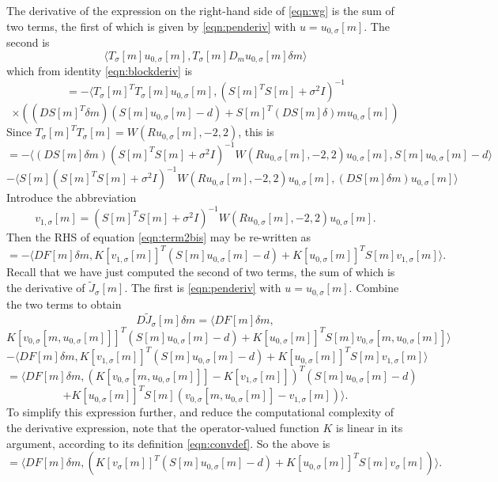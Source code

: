 The derivative of the expression on the right-hand side of
\ref{eqn:wg} is the sum of two terms, the first of which is given by
\ref{eqn:penderiv} with $u = u_{0,\sigma}[m]$. The second is
\[
  \langle T_{\sigma}[m]u_{0,\sigma}[m], T_{\sigma}[m]D_m
  u_{0,\sigma}[m]\delta m \rangle
\]
which from identity \ref{eqn:blockderiv} is
\[
  = -\langle  T_{\sigma}[m]^TT_{\sigma}[m]u_{0,\sigma}[m], (S[m]^TS[m] + \sigma^2I)^{-1}
\]
\[
  \times ((DS[m]^{T}\delta m) (S[m]u_{0,\sigma}[m]-d) +
  S[m]^T(DS[m]\delta) m u_{0,\sigma}[m])
\]
Since
$T_{\sigma}[m]^TT_{\sigma}[m] = W(Ru_{0,\sigma}[m],-2,2)$, this is
\[
  = -\langle (DS[m]\delta m) (S[m]^TS[m] +
  \sigma^2I)^{-1}W(Ru_{0,\sigma}[m],-2,2)u_{0,\sigma}[m],
  S[m]u_{0,\sigma}[m] - d \rangle
\]
\begin{equation}
  \label{eqn:term2}
  - \langle S[m] (S[m]^TS[m] +
  \sigma^2I)^{-1}W(Ru_{0,\sigma}[m],-2,2)u_{0,\sigma}[m], (DS[m]\delta
  m)u_{0,\sigma}[m] \rangle
\end{equation}
Introduce the abbreviation
\begin{equation}
  \label{eqn:defv1}
  v_{1,\sigma}[m] = (S[m]^TS[m] + \sigma^2I)^{-1}W(Ru_{0,\sigma}[m],-2,2)u_{0,\sigma}[m].
\end{equation}
Then the RHS of equation \ref{eqn:term2bis} may be re-written as
\begin{equation}
  \label{eqn:term2bis}
  = -\langle DF[m]\delta m, K[v_{1,\sigma}[m]]^T (S[m]u_{0,\sigma}[m]-d) + 
  K[u_{0,\sigma}[m]]^T S[m] v_{1,\sigma}[m] \rangle.
\end{equation}
Recall that we have just computed the second of two terms, the sum of
which is the derivative of $\tilde{J}_{\sigma}[m]$. The first is
\ref{eqn:penderiv} with $u = u_{0,\sigma}[m]$. Combine the two
terms to obtain
\[
  D\tilde{J}_{\sigma}[m] \delta m = \langle DF[m]\delta m,
\]
\[
  K[v_{0,\sigma}[m,u_{0,\sigma}[m]]]^T(S[m]u_{0,\sigma}[m]-d)
+
K[u_{0,\sigma}[m]]^T S[m]v_{0,\sigma}[m,u_{0,\sigma}[m]]\rangle
\]
\[
  -\langle DF[m]\delta m, K[v_{1,\sigma}[m]]^T (S[m]u_{0,\sigma}[m]-d) + 
  K[u_{0,\sigma}[m]]^T S[m] v_{1,\sigma}[m] \rangle
\]
\[
  = \langle DF[m]\delta
  m,(K[v_{0,\sigma}[m,u_{0,\sigma}[m]]]-K[v_{1,\sigma}[m]])^T(S[m]u_{0,\sigma}[m]-d)
\]
\[
  + K[u_{0,\sigma}[m]]^T S[m] (v_{0,\sigma}[m,u_{0,\sigma}[m]] -
  v_{1,\sigma}[m]) \rangle.
\]
To simplify this expression further, and reduce the computational
complexity of the derivative expression, note that the
operator-valued function $K$ is linear in its argument, according to
its definition \ref{eqn:convdef}. So the above is
\begin{equation}
  \label{eqn:wgderiv}
  = \langle DF[m]\delta m, (K[v_{\sigma}[m]]^T(S[m]u_{0,\sigma}[m]-d) 
  + K[u_{0,\sigma}[m]]^T S[m] v_{\sigma}[m] )\rangle.
\end{equation}

